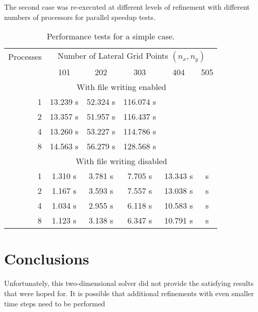 \documentclass{article}
\begin{document}
The second case was re-executed at different levels of refinement with different numbers of processors for parallel speedup tests.

\begin{table}[h!]
	\centering
	\caption{Performance tests for a simple case.}
	\label{tbl:perftests}
	\begin{tabular}{r|ccccc}
		Processes & \multicolumn{5}{c}{Number of Lateral Grid Points $(n_{x}, n_{y})$} \\
		 & 101 & 202 & 303 & 404 & 505 \\
		\hline
		 & \multicolumn{4}{c}{With file writing enabled} \\
		\hline
		1 & 13.239 s & 52.324 s & 116.074 s &  &  \\
		2 & 13.357 s & 51.957 s & 116.437 s &  &  \\
		4 & 13.260 s & 53.227 s & 114.786 s &  &  \\
		8 & 14.563 s & 56.279 s & 128.568 s &  &  \\
		\hline
		 & \multicolumn{4}{c}{With file writing disabled} \\
		\hline
		1 & 1.310 s & 3.781 s & 7.705 s & 13.343 s & s \\
		2 & 1.167 s & 3.593 s & 7.557 s & 13.038 s & s \\
		4 & 1.034 s & 2.955 s & 6.118 s & 10.583 s & s \\
		8 & 1.123 s & 3.138 s & 6.347 s & 10.791 s & s
	\end{tabular}
\end{table}

\section{Conclusions}

Unfortunately, this two-dimensional solver did not provide the satisfying results that were hoped for. It is possible that additional refinements with even smaller time steps need to be performed
\end{document}
